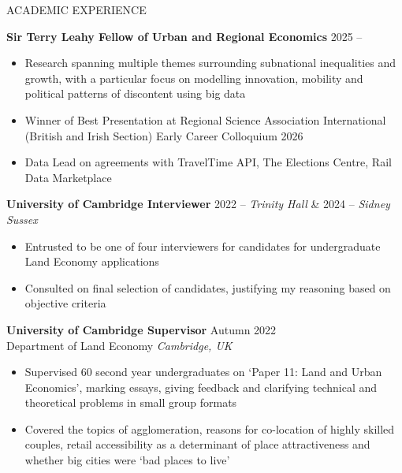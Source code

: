 \documentclass{resume}
\begin{document}
\begin{rSection}{ACADEMIC EXPERIENCE}

\textbf{Sir Terry Leahy Fellow of Urban and Regional Economics} \hfill 2025 --
\vspace{-0.5em}
 \begin{itemize}
  \itemsep -3pt {} 
   \item Research spanning multiple themes surrounding subnational inequalities and growth, with a particular focus on modelling innovation, mobility and political patterns of discontent using big data
 \item Winner of Best Presentation at Regional Science Association International (British and Irish Section) Early Career Colloquium 2026
   \item Data Lead on agreements with TravelTime API, The Elections Centre, Rail Data Marketplace
 \end{itemize}

\textbf{University of Cambridge Interviewer} \hfill  \hfill 2022 -- \textit{Trinity Hall}  \& 2024 -- \textit{Sidney Sussex}
\vspace{-0.5em}
 \begin{itemize}
    \itemsep -3pt {} 
     \item Entrusted to be one of four interviewers for candidates for undergraduate Land Economy applications 
     \item Consulted on final selection of candidates, justifying my reasoning based on objective criteria
 \end{itemize}

\textbf{University of Cambridge Supervisor} \hfill Autumn 2022 \\
Department of Land Economy \hfill \textit{Cambridge, UK}
\vspace{-0.5em}
 \begin{itemize}
    \itemsep -3pt {} 
     \item Supervised 60 second year undergraduates on `Paper 11: Land and Urban Economics', marking essays, giving feedback and clarifying technical and theoretical problems in small group formats
     \item Covered the topics of agglomeration, reasons for co-location of highly skilled couples, retail accessibility as a determinant of place attractiveness and whether big cities were `bad places to live'
 \end{itemize}

\end{rSection}
\end{document}
